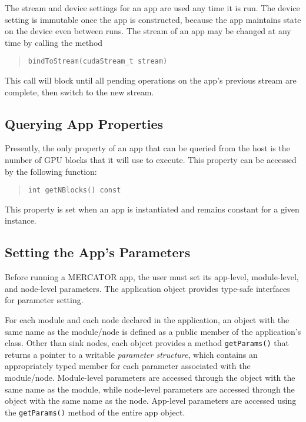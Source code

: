 \documentclass[11pt]{article}
\begin{document}
The stream and device settings for an app are used any time it is run.
The device setting is immutable once the app is constructed, because
the app maintains state on the device even between runs.  The stream
of an app may be changed at any time by calling the method
\begin{quote}
\texttt{bindToStream(cudaStream_t stream)}
\end{quote}
This call will block until all pending operations on the app's
previous stream are complete, then switch to the new stream.

\subsection{Querying App Properties}

Presently, the only property of an app that can be queried from the
host is the number of GPU blocks that it will use to execute.  This
property can be accessed by the following function:
\begin{quote}
\texttt{int getNBlocks() const}
\end{quote}
This property is set when an app is instantiated and remains
constant for a given instance.


\subsection{Setting the App's Parameters}

Before running a MERCATOR app, the user must set its app-level,
module-level, and node-level parameters.  The application object
provides type-safe interfaces for parameter setting.

For each module and each node declared in the application, an object
with the same name as the module/node is defined as a public member of
the application's class.  Other than sink nodes, each object provides
a method \texttt{getParams()} that returns a pointer to a writable
\emph{parameter structure}, which contains an appropriately typed
member for each parameter associated with the module/node.
Module-level parameters are accessed through the object with the same
name as the module, while node-level parameters are accessed through
the object with the same name as the node.  App-level parameters are
accessed using the \texttt{getParams()} method of the entire app
object.
\end{document}
